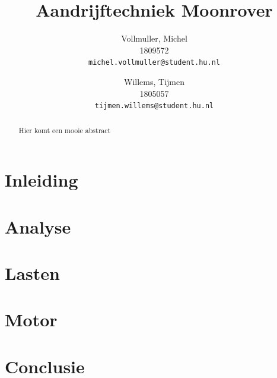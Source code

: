 \documentclass{article}
\title{Aandrijftechniek Moonrover}
\author{
  Vollmuller, Michel\\
  1809572\\
  \texttt{michel.vollmuller@student.hu.nl}
  \and
  Willems, Tijmen\\
  1805057\\
  \texttt{tijmen.willems@student.hu.nl}
}
\begin{document}
\maketitle

\begin{abstract}
    Hier komt een mooie abstract
\end{abstract}

\tableofcontents

\newpage

\section{Inleiding}


\section{Analyse} 


\newpage

\section{Lasten}


\newpage

\section{Motor}


\newpage

\section*{Conclusie}


\newpage



\newpage
\appendix 
\end{document}
